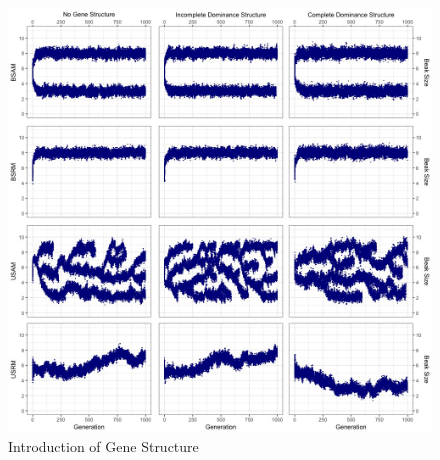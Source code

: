 \documentclass{article}
\begin{document}
\begin{figure} [h!]
    \centering
    \includegraphics[width=\linewidth]{Data/EXP2}
    \caption{Introduction of Gene Structure}
    \label{fig:EXP2}
\end{figure}
\end{document}
